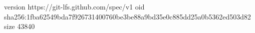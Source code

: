 version https://git-lfs.github.com/spec/v1
oid sha256:1fba62549bda7f926731400760be3be88a9bd35e0c885dd25a0b5362ed503d82
size 43840
